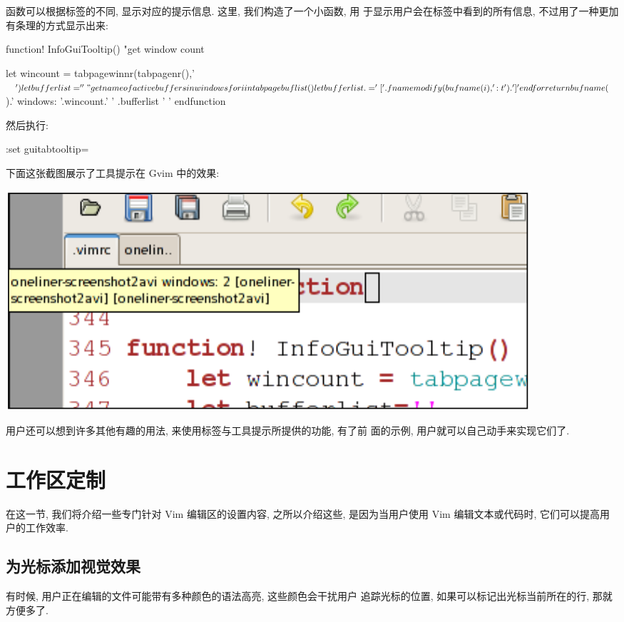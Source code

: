 函数可以根据标签的不同, 显示对应的提示信息. 这里, 我们构造了一个小函数, 用
于显示用户会在标签中看到的所有信息, 不过用了一种更加有条理的方式显示出来:
\begin{vimscript}
function! InfoGuiTooltip()
    "get window count
\end{vimscript}
\begin{vimscript}
    let wincount = tabpagewinnr(tabpagenr(),'$')
    let bufferlist=''
   "get name of active buffers in windows
    for i in tabpagebuflist()
        let bufferlist .= '['.fnamemodify(bufname(i),':t').'] ' 
    endfor
    return bufname($).' windows: '.wincount.' ' .bufferlist ' '
endfunction
\end{vimscript}
然后执行:
\begin{vimcmd}
:set guitabtooltip=%
\end{vimcmd}
下面这张截图展示了工具提示在 Gvim 中的效果:
\begin{center}
    \includegraphics[scale=0.4]{images/page37.png}
\end{center}

用户还可以想到许多其他有趣的用法, 来使用标签与工具提示所提供的功能, 有了前
面的示例, 用户就可以自己动手来实现它们了.

\section{工作区定制}
\label{sec:work_area_personalization}

在这一节, 我们将介绍一些专门针对 Vim 编辑区的设置内容, 之所以介绍这些,
是因为当用户使用 Vim 编辑文本或代码时, 它们可以提高用户的工作效率.

\subsection{为光标添加视觉效果}
\label{subsec:adding_a_more_visual_cursor}
有时候, 用户正在编辑的文件可能带有多种颜色的语法高亮, 这些颜色会干扰用户
追踪光标的位置, 如果可以标记出光标当前所在的行, 那就方便多了.

